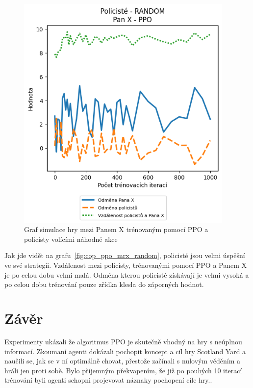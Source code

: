 \begin{figure}[H]\label{fig:cop_random_mrx_ppo}
  \centering
  \includegraphics[width=0.95\textwidth]{obrazky-figures/graphs/cop_RANDOM_mrx_PPO.png}
  \caption{Graf simulace hry mezi Panem X trénovaným pomocí PPO a policisty volícími náhodné akce}
\end{figure}

Jak jde vidět na grafu~\ref{fig:cop_ppo_mrx_random}, policisté jsou velmi úspěšní ve své strategii.
Vzdálenost mezi policisty, trénovanými pomocí PPO a Panem X je po celou dobu velmi malá.
Odměna kterou policisté získávají je velmi vysoká a po celou dobu trénování pouze zřídka klesla do záporných hodnot.

\chapter{Závěr}
\label{ch:zaver}

Experimenty ukázali že algoritmus PPO je skutečně vhodný na hry s neúplnou informací.
Zkoumaní agenti dokázali pochopit koncept a cíl hry Scotland Yard a naučili se, jak se v ní optimálně chovat, přestože začínali s nulovým věděním a hráli jen proti sobě.
Bylo příjemným překvapením, že již po pouhých 10 iterací trénování byli agenti schopni projevovat náznaky pochopení cíle hry..

